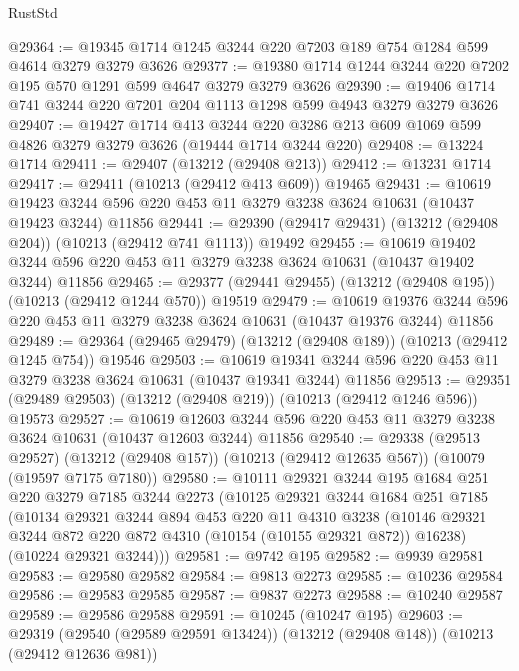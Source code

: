 \begin{lexlean}{RustStd}
\begin{coremodule}
@29364 := @19345 @1714 @1245 @3244 @220 @7203 @189 @754 @1284 @599 @4614 @3279 @3279 @3626
@29377 := @19380 @1714 @1244 @3244 @220 @7202 @195 @570 @1291 @599 @4647 @3279 @3279 @3626
@29390 := @19406 @1714 @741 @3244 @220 @7201 @204 @1113 @1298 @599 @4943 @3279 @3279 @3626
@29407 := @19427
    @1714
    @413
    @3244
    @220
    @3286
    @213
    @609
    @1069
    @599
    @4826
    @3279
    @3279
    @3626
    (@19444 @1714 @3244 @220)
@29408 := @13224 @1714
@29411 := @29407 (@13212 (@29408 @213))
@29412 := @13231 @1714
@29417 := @29411 (@10213 (@29412 @413 @609)) @19465
@29431 := @10619
    @19423
    @3244
    @596
    @220
    @453
    @11
    @3279
    @3238
    @3624
    @10631
    (@10437 @19423 @3244)
    @11856
@29441 := @29390 (@29417 @29431) (@13212 (@29408 @204)) (@10213 (@29412 @741 @1113)) @19492
@29455 := @10619
    @19402
    @3244
    @596
    @220
    @453
    @11
    @3279
    @3238
    @3624
    @10631
    (@10437 @19402 @3244)
    @11856
@29465 := @29377 (@29441 @29455) (@13212 (@29408 @195)) (@10213 (@29412 @1244 @570)) @19519
@29479 := @10619
    @19376
    @3244
    @596
    @220
    @453
    @11
    @3279
    @3238
    @3624
    @10631
    (@10437 @19376 @3244)
    @11856
@29489 := @29364 (@29465 @29479) (@13212 (@29408 @189)) (@10213 (@29412 @1245 @754)) @19546
@29503 := @10619
    @19341
    @3244
    @596
    @220
    @453
    @11
    @3279
    @3238
    @3624
    @10631
    (@10437 @19341 @3244)
    @11856
@29513 := @29351 (@29489 @29503) (@13212 (@29408 @219)) (@10213 (@29412 @1246 @596)) @19573
@29527 := @10619
    @12603
    @3244
    @596
    @220
    @453
    @11
    @3279
    @3238
    @3624
    @10631
    (@10437 @12603 @3244)
    @11856
@29540 := @29338
    (@29513 @29527)
    (@13212 (@29408 @157))
    (@10213 (@29412 @12635 @567))
    (@10079 (@19597 @7175 @7180))
@29580 := @10111
    @29321
    @3244
    @195
    @1684
    @251
    @220
    @3279
    @7185
    @3244
    @2273
    (@10125
      @29321
      @3244
      @1684
      @251
      @7185
      (@10134
        @29321
        @3244
        @894
        @453
        @220
        @11
        @4310
        @3238
        (@10146 @29321 @3244 @872 @220 @872 @4310 (@10154 (@10155 @29321 @872)) @16238)
        (@10224 @29321 @3244)))
@29581 := @9742 @195
@29582 := @9939 @29581
@29583 := @29580 @29582
@29584 := @9813 @2273
@29585 := @10236 @29584
@29586 := @29583 @29585
@29587 := @9837 @2273
@29588 := @10240 @29587
@29589 := @29586 @29588
@29591 := @10245 (@10247 @195)
@29603 := @29319
    (@29540 (@29589 @29591 @13424))
    (@13212 (@29408 @148))
    (@10213 (@29412 @12636 @981))

\end{coremodule}
\end{lexlean}
